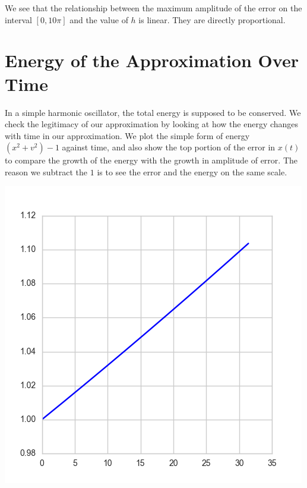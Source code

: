 \documentclass[12pt, letterpaper]{article}
\begin{document}
We see that the relationship between the maximum amplitude of the error on the interval $[0, 10\pi]$ and the value of $h$ is linear. They are directly proportional.

\section{Energy of the Approximation Over Time}

In a simple harmonic oscillator, the total energy is supposed to be conserved. We check the legitimacy of our approximation by looking at how the energy changes with time in our approximation. We plot the simple form of energy $(x^2+v^2) - 1$ against time, and also show the top portion of the error in $x(t)$ to compare the growth of the energy with the growth in amplitude of error. The reason we subtract the $1$ is to see the error and the energy on the same scale.

\begin{center}
\includegraphics[scale=0.8]{energy.png}
\end{center}
\end{document}

